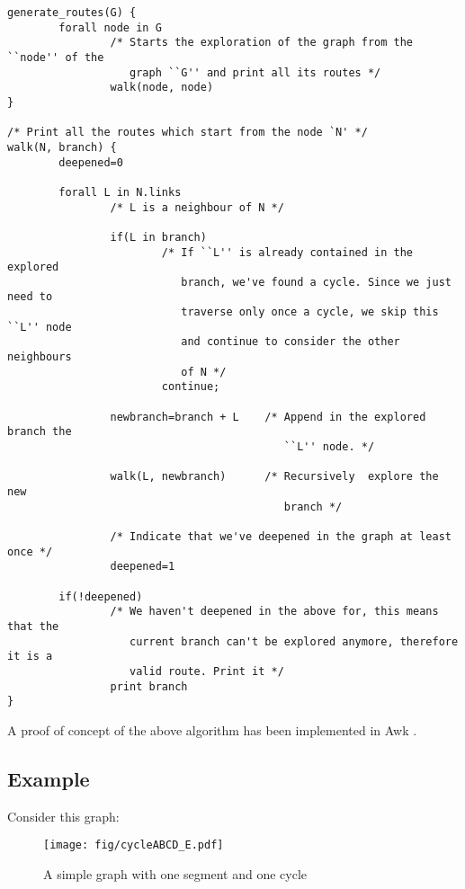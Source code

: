 \documentclass[a4paper]{article}
\begin{document}
\begin{verbatim}
generate_routes(G) {
        forall node in G
                /* Starts the exploration of the graph from the ``node'' of the
                   graph ``G'' and print all its routes */
                walk(node, node)
}

/* Print all the routes which start from the node `N' */
walk(N, branch) {
        deepened=0

        forall L in N.links
                /* L is a neighbour of N */

                if(L in branch)
                        /* If ``L'' is already contained in the explored
                           branch, we've found a cycle. Since we just need to
                           traverse only once a cycle, we skip this ``L'' node
                           and continue to consider the other neighbours
                           of N */
                        continue;

                newbranch=branch + L    /* Append in the explored branch the
                                           ``L'' node. */

                walk(L, newbranch)      /* Recursively  explore the new
                                           branch */
                
                /* Indicate that we've deepened in the graph at least once */
                deepened=1

        if(!deepened)
                /* We haven't deepened in the above for, this means that the
                   current branch can't be explored anymore, therefore it is a
                   valid route. Print it */
                print branch
}
\end{verbatim}

A proof of concept of the above algorithm has been implemented in Awk
\cite{genrouteawk}.

\subsection*{Example}
Consider this graph:

\begin{figure}[h]
	\begin{center}
		\texttt{[image: fig/cycleABCD\_E.pdf]}
	\end{center}
	\caption{A simple graph with one segment and one cycle}
	\label{fig:gen_route_sample}
\end{figure}
\end{document}
